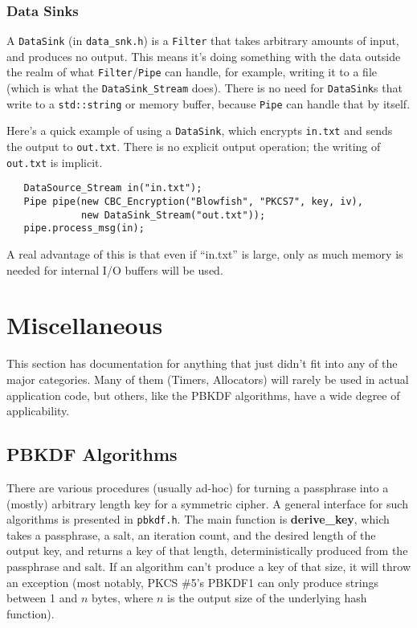 \documentclass{article}
\newcommand{\filename}[1]{\texttt{#1}}
\newcommand{\function}[1]{\textbf{#1}}
\newcommand{\type}[1]{\texttt{#1}}
\begin{document}
\subsubsection{Data Sinks}

A \type{DataSink} (in \filename{data\_snk.h}) is a \type{Filter} that
takes arbitrary amounts of input, and produces no output. This means
it's doing something with the data outside the realm of what
\type{Filter}/\type{Pipe} can handle, for example, writing it to a
file (which is what the \type{DataSink\_Stream} does). There is no
need for \type{DataSink}s that write to a \type{std::string} or memory
buffer, because \type{Pipe} can handle that by itself.

Here's a quick example of using a \type{DataSink}, which encrypts
\filename{in.txt} and sends the output to \filename{out.txt}. There is
no explicit output operation; the writing of \filename{out.txt} is
implicit.

\begin{verbatim}
   DataSource_Stream in("in.txt");
   Pipe pipe(new CBC_Encryption("Blowfish", "PKCS7", key, iv),
             new DataSink_Stream("out.txt"));
   pipe.process_msg(in);
\end{verbatim}

A real advantage of this is that even if ``in.txt'' is large, only as
much memory is needed for internal I/O buffers will be used.

\section{Miscellaneous}

This section has documentation for anything that just didn't fit into
any of the major categories. Many of them (Timers, Allocators) will
rarely be used in actual application code, but others, like the PBKDF
algorithms, have a wide degree of applicability.

\subsection{PBKDF Algorithms}

There are various procedures (usually ad-hoc) for turning a
passphrase into a (mostly) arbitrary length key for a symmetric
cipher. A general interface for such algorithms is presented in
\filename{pbkdf.h}. The main function is \function{derive\_key}, which
takes a passphrase, a salt, an iteration count, and the desired length
of the output key, and returns a key of that length, deterministically
produced from the passphrase and salt. If an algorithm can't produce a
key of that size, it will throw an exception (most notably, PKCS \#5's
PBKDF1 can only produce strings between 1 and $n$ bytes, where $n$ is
the output size of the underlying hash function).
\end{document}
